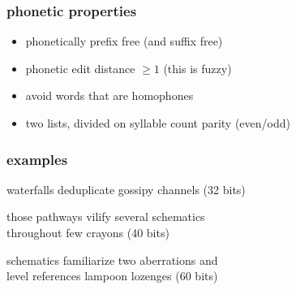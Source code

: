 \documentclass[xetex]{beamer}
\begin{document}
\begin{frame}
\frametitle{phonetic properties}
\begin{itemize}
\item phonetically prefix free (and suffix free)
\item phonetic edit distance $\geq 1$ (this is fuzzy)
\item avoid words that are homophones
\item two lists, divided on syllable count parity (even/odd)
\end{itemize}
\end{frame}


\begin{frame}
\frametitle{examples}
\begin{center}
waterfalls deduplicate gossipy channels (32 bits)

\vspace{1cm}

those pathways vilify several schematics \\ throughout few crayons (40 bits)

\vspace{1cm}

schematics familiarize two aberrations and \\ level references lampoon lozenges (60 bits)
\end{center}
\end{frame}


\begin{frame}

\end{frame}
\end{document}
